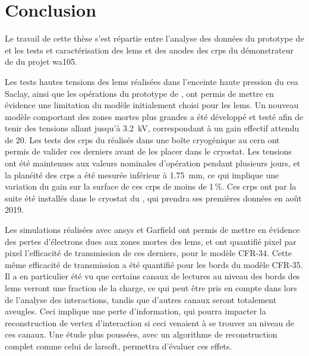 \chapter{Conclusion}

Le travail de cette thèse s'est répartie entre l'analyse des données du prototype de \TOO{} et les tests et caractérisation des \glspl{lem} et des anodes des \glspl{crp} du démonstrateur de \SSS{} du projet \gls{wa105}.

Les tests hautes tensions des \glspl{lem} réalisées dans l'enceinte haute pression du \gls{cea} Saclay, ainsi que les opérations du prototype de \TOO{}, ont permis de mettre en évidence une limitation du modèle initialement choisi pour les \glspl{lem}. Un nouveau modèle comportant des zones mortes plus grandes a été développé et testé afin de tenir des tensions allant jusqu'à \SI{3.2}{\kilo\volt}, correspondant à un gain effectif attendu de 20. Les tests des \glspl{crp} du \SSS{} réalisés dans une boîte cryogénique au \gls{cern} ont permis de valider ces derniers avant de les placer dans le cryostat. Les tensions ont été maintenues aux valeurs nominales d'opération pendant plusieurs jours, et la planéité des \glspl{crp} a été mesurée inférieur à \SI{1.75}{\milli\meter}, ce qui implique une variation du gain sur la surface de ces \glspl{crp} de moins de 1\,\%. Ces \glspl{crp} ont par la suite été installés dans le cryostat du \SSS{}, qui prendra ses premières données en août 2019.

Les simulations réalisées avec \gls{ansys} et Garfield ont permis de mettre en évidence des pertes d'électrons dues aux zones mortes des \glspl{lem}, et ont quantifié pixel par pixel l'efficacité de transmission de ces derniers, pour le modèle CFR-34. Cette même efficacité de transmission a été quantifié pour les bords du modèle CFR-35. Il a en particulier été vu que certains canaux de lectures au niveau des bords des \glspl{lem} verront une fraction de la charge, ce qui peut être pris en compte dans lors de l'analyse des interactions, tandis que d'autres canaux seront totalement aveugles. Ceci implique une perte d'information, qui pourra impacter la reconstruction de vertex d'interaction si ceci venaient à se trouver au niveau de ces canaux. Une étude plus poussées, avec un algorithme de reconstruction complet comme celui de \gls{larsoft}, permettra d'évaluer ces effets.

